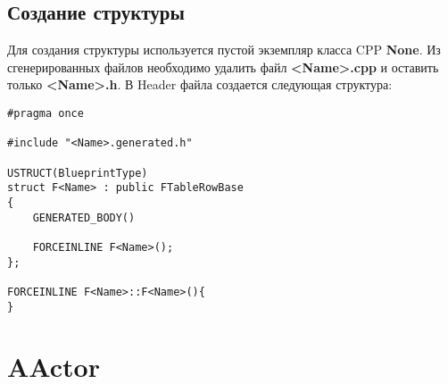 \documentclass[a4paper,article,14pt]{extarticle}
\begin{document}
\subsection{Создание структуры}

Для создания структуры используется пустой экземпляр класса CPP \textbf{None}. Из сгенерированных файлов необходимо удалить файл \textbf{<Name>.cpp} и оставить только \textbf{<Name>.h}. В Header файла создается следующая структура:
\\
\lstset{language=C}          
\begin{lstlisting}           
#pragma once

#include "<Name>.generated.h"

USTRUCT(BlueprintType)
struct F<Name> : public FTableRowBase
{
	GENERATED_BODY()
    
	FORCEINLINE F<Name>();
};

FORCEINLINE F<Name>::F<Name>(){
}
\end{lstlisting}          

\newpage
\section{AActor}
\end{document}
